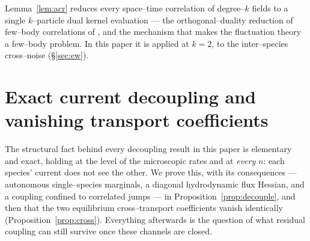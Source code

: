 \documentclass[11pt]{article}
\theoremstyle{plain}
\theoremstyle{definition}
\theoremstyle{remark}
\begin{document}
\noindent Lemma~\ref{lem:acr} reduces every space--time correlation of degree--$k$
fields to a single $k$--particle dual kernel evaluation --- the orthogonal--duality
reduction of few--body correlations of \cite{ACR,ACR2}, and the mechanism that makes the
fluctuation theory a few--body problem. In this paper it is applied at $k=2$, to the
inter--species cross--noise (\S\ref{sec:ew}).

\section{Exact current decoupling and vanishing transport coefficients}\label{sec:decouple}

The structural fact behind every decoupling result in this paper is elementary and
exact, holding at the level of the microscopic rates and at \emph{every} $n$: each
species' current does not see the other. We prove this, with its consequences ---
autonomous single--species marginals, a diagonal hydrodynamic flux Hessian, and a
coupling confined to correlated jumps --- in Proposition~\ref{prop:decouple}, and then
that the two equilibrium cross--transport coefficients vanish identically
(Proposition~\ref{prop:cross}). Everything afterwards is the question of what residual
coupling can still survive once these channels are closed.
\end{document}
